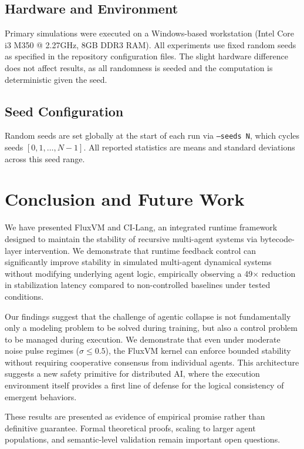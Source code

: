 \documentclass{article}
\begin{document}
\subsection{Hardware and Environment}
Primary simulations were executed on a Windows-based workstation (Intel Core i3 M350 @ 2.27GHz, 8GB DDR3 RAM). All experiments use fixed random seeds as specified in the repository configuration files. The slight hardware difference does not affect results, as all randomness is seeded and the computation is deterministic given the seed.

\subsection{Seed Configuration}
Random seeds are set globally at the start of each run via \texttt{--seeds N}, which cycles seeds $[0, 1, \ldots, N-1]$. All reported statistics are means and standard deviations across this seed range.

\newpage

\section{Conclusion and Future Work}
\label{sec:conclusion_master}

We have presented FluxVM and CI-Lang, an integrated runtime framework designed to maintain the stability of recursive multi-agent systems via bytecode-layer intervention. We demonstrate that runtime feedback control can significantly improve stability in simulated multi-agent dynamical systems without modifying underlying agent logic, empirically observing a 49$\times$ reduction in stabilization latency compared to non-controlled baselines under tested conditions.

Our findings suggest that the challenge of agentic collapse is not fundamentally only a modeling problem to be solved during training, but also a control problem to be managed during execution. We demonstrate that even under moderate noise pulse regimes ($\sigma \leq 0.5$), the FluxVM kernel can enforce bounded stability without requiring cooperative consensus from individual agents. This architecture suggests a new safety primitive for distributed AI, where the execution environment itself provides a first line of defense for the logical consistency of emergent behaviors.

These results are presented as evidence of empirical promise rather than definitive guarantee. Formal theoretical proofs, scaling to larger agent populations, and semantic-level validation remain important open questions.
\end{document}
